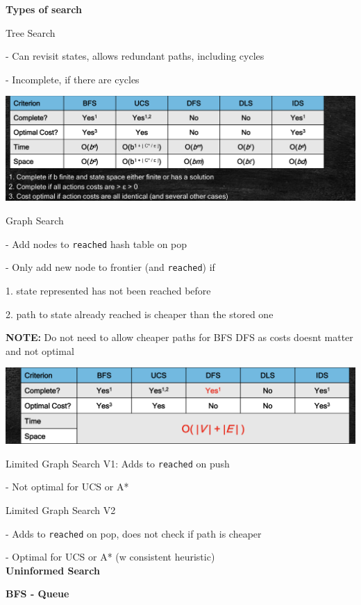 \documentclass[10pt, a4paper]{article}
\newcommand{\highlight}[1]{{\color{red}\textbf{#1}}}
\newcommand{\red}[1]{{\color{red}#1}}
\newcommand{\green}[1]{{\color{PineGreen}#1}}
\newcommand{\header}[1]{{\normalsize\textbf{#1}}}
\newcommand{\tab}[0]{\hspace*{2mm}}
\begin{document}
\begin{multicols*}{3}
		\textbf{Types of search}

		Tree Search
		
		\tab - Can revisit states, allows redundant paths, including cycles

		\tab - Incomplete, if there are cycles

		\includegraphics[scale=0.15]{./assets/treeSearch.png}

		Graph Search

		\tab - Add nodes to \texttt{reached} hash table on pop 

		\tab - Only add new node to frontier (and \texttt{reached}) if

		\tab \tab 1. state represented has not been reached before

		\tab \tab 2. path to state already reached is cheaper than the stored one

		\highlight{NOTE:} Do \red{not} need to allow cheaper paths for BFS DFS as costs doesnt matter and not optimal

		\includegraphics[scale=.15]{./assets/graphSearch.png}

		Limited Graph Search V1: Adds to \texttt{reached} \red{on push}

		\tab{} - \red{Not optimal} for UCS or A*

		Limited Graph Search V2

		\tab - Adds to \texttt{reached} on \red{pop}, \red{does not} check if path is cheaper 

		\tab - \green{Optimal} for UCS or A* (w consistent heuristic)\\

		\header{Uninformed Search}

		\textbf{BFS - Queue}



\end{multicols*}
\end{document}
